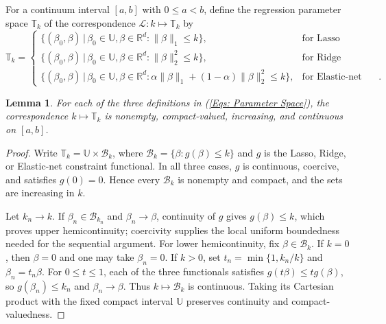 \documentclass[12pt]{article}
\newenvironment{bluechange}{\begingroup\color[rgb]{0.00,0.00,1.00}}{\endgroup}
\newtheorem{lemma}{Lemma}
\theoremstyle{remark}
\theoremstyle{plain}
\begin{document}
For a continuum interval $[a,b]$ with $0\le a<b$, define the regression parameter space $\mathbb{T}_k$ of the correspondence $\mathcal{L}:k\mapsto\mathbb{T}_k$ by
\begin{equation}\label{Eqs: Parameter Space}
    \mathbb{T}_k = \begin{cases}
        \{(\beta_0, \beta) \, |\, \beta_0 \in \mathbb{U}, \beta\in \mathbb{R}^d: \lVert\beta\rVert_1 \leq k\}, & \text{for Lasso regression}\\
        \{(\beta_0, \beta) \, |\, \beta_0 \in \mathbb{U}, \beta\in \mathbb{R}^d: \lVert\beta\rVert_2^2 \leq k\}, & \text{for Ridge regression}\\
        \{(\beta_0, \beta) \, |\, \beta_0 \in \mathbb{U}, \beta\in \mathbb{R}^d: \alpha\lVert\beta\rVert_1 + (1-\alpha)\lVert\beta\rVert_2^2 \leq k\}, & \text{for Elastic-net regression}.
    \end{cases}
\end{equation}
\begin{bluechange}
\begin{lemma}\label{Lemma: constraint correspondence continuity}
For each of the three definitions in (\ref{Eqs: Parameter Space}), the correspondence $k\mapsto\mathbb T_k$ is nonempty, compact-valued, increasing, and continuous on $[a,b]$.
\end{lemma}
\begin{proof}
Write $\mathbb T_k=\mathbb U\times\mathcal B_k$, where $\mathcal B_k=\{\beta:g(\beta)\le k\}$ and $g$ is the Lasso, Ridge, or Elastic-net constraint functional. In all three cases, $g$ is continuous, coercive, and satisfies $g(0)=0$. Hence every $\mathcal B_k$ is nonempty and compact, and the sets are increasing in $k$.

Let $k_n\to k$. If $\beta_n\in\mathcal B_{k_n}$ and $\beta_n\to\beta$, continuity of $g$ gives $g(\beta)\le k$, which proves upper hemicontinuity; coercivity supplies the local uniform boundedness needed for the sequential argument. For lower hemicontinuity, fix $\beta\in\mathcal B_k$. If $k=0$, then $\beta=0$ and one may take $\beta_n=0$. If $k>0$, set $t_n=\min\{1,k_n/k\}$ and $\beta_n=t_n\beta$. For $0\le t\le1$, each of the three functionals satisfies $g(t\beta)\le t g(\beta)$, so $g(\beta_n)\le k_n$ and $\beta_n\to\beta$. Thus $k\mapsto\mathcal B_k$ is continuous. Taking its Cartesian product with the fixed compact interval $\mathbb U$ preserves continuity and compact-valuedness.
\end{proof}
\end{bluechange}
\end{document}
